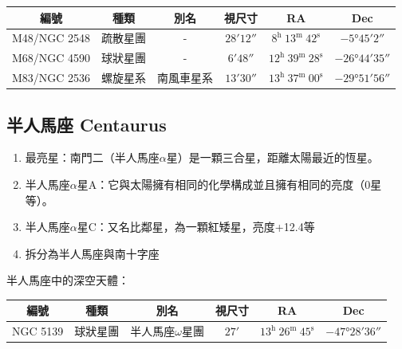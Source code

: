 \begin{center}
\begin{longtable}{c | c | c | c | c | c}
    編號 & 種類 & 別名 & 視尺寸 & RA & Dec \\
    \hline
    \endfirsthead


    \endfoot

    \endlastfoot

    M48/NGC 2548 & 疏散星團 & - & \(\ang{;28;12}\) & \(8^\text{h }13^\text{m }42^\text{s}\) & \(-\ang{5;45;2}\) \\
    M68/NGC 4590 & 球狀星團 & - & \(\ang{;6;48}\) & \(12^\text{h }39^\text{m }28^\text{s}\) & \(-\ang{26;44;35}\) \\
    M83/NGC 2536 & 螺旋星系 & 南風車星系 & \(\ang{;13;30}\) & \(13^\text{h }37^\text{m }00^\text{s}\) & \(-\ang{29;51;56}\)
\end{longtable}
\end{center}

\subsection{半人馬座 Centaurus}
\begin{enumerate}
    \item 最亮星：南門二（半人馬座\(\alpha\)星）是一顆三合星，距離太陽最近的恆星。
    \item 半人馬座\(\alpha\)星A：它與太陽擁有相同的化學構成並且擁有相同的亮度（0星等）。
    \item 半人馬座\(\alpha\)星C：又名比鄰星，為一顆紅矮星，亮度+12.4等
    \item 拆分為半人馬座與南十字座
\end{enumerate}
半人馬座中的深空天體：

\begin{center}
\begin{longtable}{c | c | c | c | c | c}
    編號 & 種類 & 別名 & 視尺寸 & RA & Dec \\
    \hline
    \endfirsthead


    \endfoot

    \endlastfoot

    NGC 5139 & 球狀星團 & 半人馬座\(\omega\)星團 & \(\ang{;27;}\) & \(13^\text{h }26^\text{m }45^\text{s}\) & \(-\ang{47;28;36}\) \\
\end{longtable}
\end{center}

